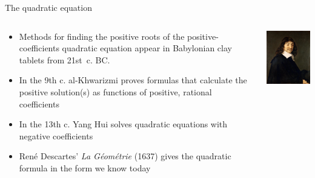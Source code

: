 

\begin{frame}[fragile]{The quadratic equation}

\begin{columns}

  \begin{column}{7.5cm}
  \begin{itemize}
  \item Methods for finding the positive roots of the
    positive-coefficients quadratic equation appear in Babylonian clay
    tablets from 21st~c. BC.
  \item In the 9th c. al-Khwarizmi proves formulas that calculate the
    positive solution(s) as functions of positive, rational coefficients
  \item In the 13th c. Yang Hui solves quadratic equations with
    negative coefficients
  \item Ren{\' e} Descartes' \emph{La G{\' e}om{\' e}trie} (1637)
    gives the quadratic formula in the form we know today
  \end{itemize}
  \end{column}

  \begin{column}{4.5cm}
  \includegraphics[width=4cm]{contents/images/descartes}
  \end{column}

\end{columns}

\end{frame}

  


